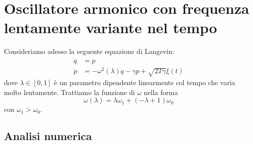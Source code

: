 \documentclass[10pt,a4paper]{article}
\begin{document}


\section{Oscillatore armonico con frequenza lentamente variante nel tempo}

Consideriamo adesso la seguente equazione di Langevin:
\begin{align}
	\dot{q} &= p \\
	\dot{p} &= -\omega^2(\lambda)q - \gamma p + \sqrt{2T\gamma} \xi(t)
\end{align}
dove \(\lambda\in[0,1]\) è un parametro dipendente linearmente col tempo che varia molto lentamente. Trattiamo la funzione di \(\omega\) nella forma
\begin{equation}
 	\omega (\lambda) = \lambda \omega_1 + (-\lambda + 1) \omega_0
\end{equation} 
con \(\omega_1 > \omega_0\).

\subsection{Analisi numerica}
\end{document}
